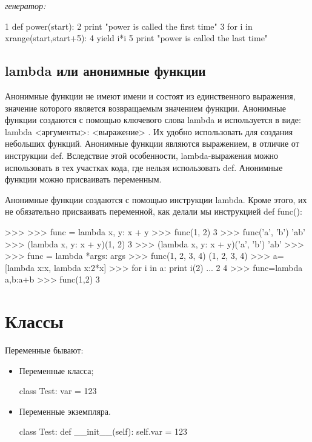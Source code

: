 \textit{генератор:}
\begin{python}
1 def power(start):
2     print "power is called the first time"
3     for i in xrange(start,start+5):
4         yield i*i
5     print "power is called the last time"
\end{python}

\subsection{lambda или анонимные функции}

Анонимные функции не имеют имени и состоят из единственного выражения, значение которого является возвращаемым значением функции. Анонимные функции создаются с помощью ключевого слова lambda и используется в виде: lambda <аргументы>: <выражение> . Их удобно использовать для создания небольших функций. Анонимные функции являются выражением, в отличие от инструкции def. Вследствие этой особенности, lambda-выражения можно использовать в тех участках кода, где нельзя использовать def. Анонимные функции можно присваивать переменным.

Анонимные функции создаются с помощью инструкции lambda. Кроме этого, их не обязательно присваивать переменной, как делали мы инструкцией def func():
\begin{python}
>>>
>>> func = lambda x, y: x + y
>>> func(1, 2)
3
>>> func('a', 'b')
'ab'
>>> (lambda x, y: x + y)(1, 2)
3
>>> (lambda x, y: x + y)('a', 'b')
'ab'
>>>
>>> func = lambda *args: args
>>> func(1, 2, 3, 4)
(1, 2, 3, 4)
>>> a=[lambda x:x, lambda x:2*x]
>>> for i in a: print i(2)
...
2
4
>>> func=lambda a,b:a+b
>>> func(1,2)
3
\end{python}

\section{Классы}

Переменные бывают:
\begin{itemize}
    \item Переменные класса;
    \begin{python}
    class Test:
        var = 123
    \end{python}
    \item Переменные экземпляра.
    \begin{python}
    class Test:
        def __init__(self):
            self.var = 123
    \end{python}
\end{itemize}

